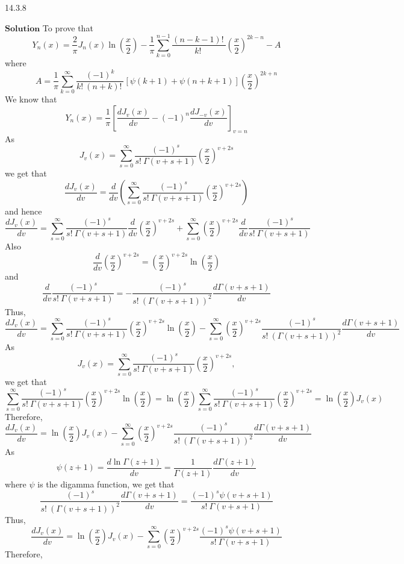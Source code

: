 \documentclass{article}
\begin{document}
\begin{flushleft}
\begin{mybox}{14.3.8}
\end{mybox}
$\boxed{\textbf{Solution}}$ To prove that 
$$Y_{n}(x)=\frac{2}{\pi} J_{n}(x) \ln \left(\frac{x}{2}\right)-\frac{1}{\pi} \sum_{k=0}^{n-1} \frac{(n-k-1) ! \ }{k ! \ }\left(\frac{x}{2}\right)^{2 k-n}-A$$ 
where
$$A=\frac{1}{\pi} \sum_{k=0}^{\infty} \frac{(-1)^{k}}{k ! \ (n+k) ! \ }[\psi(k+1)+\psi(n+k+1)]\left(\frac{x}{2}\right)^{2 k+n}$$
We know that 
$$Y_{n}(x)=\frac{1}{\pi}\left[\frac{d J_{v}(x)}{d v}-(-1)^{n} \frac{d J_{-v}(x)}{d v}\right]_{v=n}$$
As 
$$J_{v}(x)=\sum_{s=0}^{\infty} \frac{(-1)^{s}}{s ! \  \Gamma(v+s+1)}\left(\frac{x}{2}\right)^{v+2 s}$$ 
we get that 
$$\frac{d J_{v}(x)}{d v}=\frac{d}{d v}\left(\sum_{s=0}^{\infty} \frac{(-1)^{s}}{s ! \  \Gamma(v+s+1)}\left(\frac{x}{2}\right)^{v+2 s}\right)$$
and hence 
$$\frac{d J_{v}(x)}{d v}=\sum_{s=0}^{\infty} \frac{(-1)^{s}}{s ! \  \Gamma(v+s+1)} \frac{d}{d v}\left(\frac{x}{2}\right)^{v+2 s}+\sum_{s=0}^{\infty}\left(\frac{x}{2}\right)^{v+2 s} \frac{d}{d v} \frac{(-1)^{s}}{s ! \  \Gamma(v+s+1)}$$
Also 
$$\frac{d}{d v}\left(\frac{x}{2}\right)^{v+2 s}=\left(\frac{x}{2}\right)^{v+2 s} \ln \left(\frac{x}{2}\right)$$ 
and 
$$\frac{d}{d v} \frac{(-1)^{s}}{s ! \  \Gamma(v+s+1)}=-\frac{(-1)^{s}}{s ! \ (\Gamma(v+s+1))^{2}} \frac{d \Gamma(v+s+1)}{d v}$$
Thus, 
$$\frac{d J_{v}(x)}{d v}=\sum_{s=0}^{\infty} \frac{(-1)^{s}}{s ! \  \Gamma(v+s+1)}\left(\frac{x}{2}\right)^{v+2 s} \ln \left(\frac{x}{2}\right)-\sum_{s=0}^{\infty}\left(\frac{x}{2}\right)^{v+2 s} \frac{(-1)^{s}}{s ! \ (\Gamma(v+s+1))^{2}} \frac{d \Gamma(v+s+1)}{d v}$$
As 
$$J_{v}(x)=\sum_{s=0}^{\infty} \frac{(-1)^{s}}{s ! \  \Gamma(v+s+1)}\left(\frac{x}{2}\right)^{v+2 s},$$ 
we get that
$$\sum_{s=0}^{\infty} \frac{(-1)^{s}}{s ! \  \Gamma(v+s+1)}\left(\frac{x}{2}\right)^{v+2 s} \ln \left(\frac{x}{2}\right)=\ln \left(\frac{x}{2}\right) \sum_{s=0}^{\infty} \frac{(-1)^{s}}{s ! \  \Gamma(v+s+1)}\left(\frac{x}{2}\right)^{v+2 s}=\ln \left(\frac{x}{2}\right) J_{v}(x)$$
Therefore, 
$$\frac{d J_{v}(x)}{d v}=\ln \left(\frac{x}{2}\right) J_{v}(x)-\sum_{s=0}^{\infty}\left(\frac{x}{2}\right)^{v+2 s} \frac{(-1)^{s}}{s ! \ (\Gamma(v+s+1))^{2}} \frac{d \Gamma(v+s+1)}{d v}$$
As 
$$\psi(z+1)=\frac{d \ln \Gamma(z+1)}{d v}=\frac{1}{\Gamma(z+1)} \frac{d \Gamma(z+1)}{d v}$$ 
where $\psi$ is the digamma function, we get that 
$$\frac{(-1)^{s}}{s ! \ (\Gamma(v+s+1))^{2}} \frac{d \Gamma(v+s+1)}{d v}=\frac{(-1)^{s} \psi(v+s+1)}{s ! \  \Gamma(v+s+1)}$$
Thus, 
$$\frac{d J_{v}(x)}{d v}=\ln \left(\frac{x}{2}\right) J_{v}(x)-\sum_{s=0}^{\infty}\left(\frac{x}{2}\right)^{v+2 s} \frac{(-1)^{s} \psi(v+s+1)}{s ! \  \Gamma(v+s+1)}$$
Therefore, 

\end{flushleft}
\end{document}
